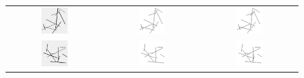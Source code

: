 \documentclass[11pt]{article}
\begin{document}
\pagebreak

\begin{figure}
  \begin{tabular}{ccc}
    \includegraphics[width=0.3\textwidth]{Images/randimage1.png}&
    \includegraphics[width=0.3\textwidth]{Images/randold1.png}&
    \includegraphics[width=0.3\textwidth]{Images/randnew1.png} \\
    \includegraphics[width=0.3\textwidth]{Images/randimage2.png}&
    \includegraphics[width=0.3\textwidth]{Images/randold2.png}&
    \includegraphics[width=0.3\textwidth]{Images/randnew2.png}\\




\end{tabular}
\end{figure}
\end{document}
